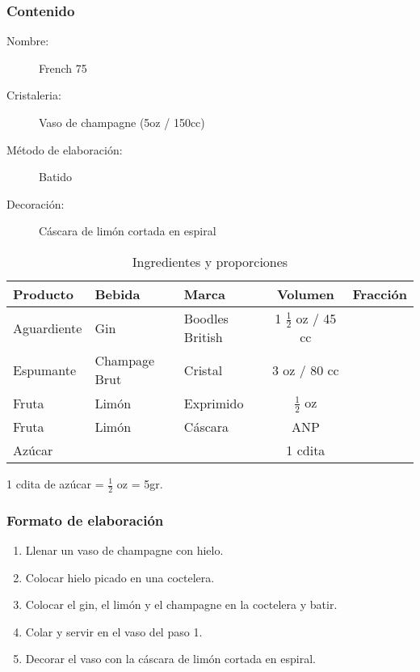 \bigskip 
\bigskip 
 
\subsubsection{Contenido}
\bigskip 
\begin{description}
\item[Nombre:] French 75
\item[Cristaleria:] Vaso de champagne (5oz / 150cc)
\item[M\'etodo de elaboraci\'on:] Batido
\item[Decoraci\'on:] C\'ascara de lim\'on cortada en espiral
\end{description}

\begin{table}[h]
\caption{Ingredientes y proporciones} 
\label{tab:fonts}
\begin{center}       
\begin{tabular}{|l|l|l|c|l|} %
\hline
\rule[-1ex]{0pt}{3.5ex}  \textbf{Producto} & \textbf{Bebida} & \textbf{Marca} & \textbf{Volumen} & \textbf{Fracci\'on}  \\
\hline
\rule[-1ex]{0pt}{3.5ex}  Aguardiente & Gin 			& Boodles British 		& 1 $\frac{1}{2}$ oz / 45 cc 	&  	\\
\hline
\rule[-1ex]{0pt}{3.5ex}  Espumante	& Champage Brut 	& Cristal 				& 3 oz / 80 cc 		&  	\\
\hline
\rule[-1ex]{0pt}{3.5ex}  Fruta 		& Lim\'on	 	& Exprimido				& $\frac{1}{2}$	oz		& 	\\
\hline
\rule[-1ex]{0pt}{3.5ex}  Fruta 		& Lim\'on	 	& C\'ascara				& ANP			& 	\\
\hline
\rule[-1ex]{0pt}{3.5ex}  Az\'ucar 		& 			 	& 					& 1 cdita		& 	\\
\hline
\end{tabular}
\end{center}
\end{table} 
1 cdita de az\'ucar = $\frac{1}{2}$ oz = 5gr.
\bigskip 

\subsubsection{Formato de elaboraci\'on} 
\label{sec:title}
\bigskip 
\begin{center}
\begin{enumerate}
\item Llenar un vaso de champagne con hielo.
\item Colocar hielo picado en una coctelera.
\item Colocar el gin, el lim\'on y el champagne en la coctelera y batir.
\item Colar y servir en el vaso del paso 1.
\item Decorar el vaso con la c\'ascara de lim\'on cortada en espiral.
\end{enumerate}
\end{center}
\bigskip \bigskip 
\bigskip 

